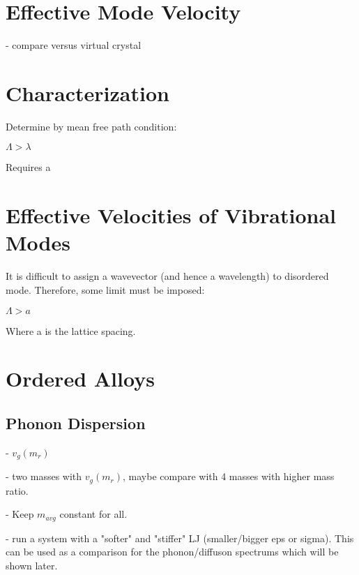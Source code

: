\documentclass[aps,prb,preprint,superscriptaddress,amsmath,amssymb,floatfix]{revtex4}
\begin{document}
\section{\label{S:GroupVeloctiy}Effective Mode Velocity}

- compare versus virtual crystal

\section{\label{S-Motivation}Characterization}

Determine by mean free path condition:

$\Lambda > \lambda$

Requires a 

\section{\label{S-Motivation}Effective Velocities of Vibrational Modes}




It is difficult to assign a wavevector (and hence a wavelength) to 
disordered mode.  Therefore, some limit must be imposed:

$\Lambda > a$

Where a is the lattice spacing.

\section{\label{S-Motivation}Ordered Alloys}

\subsection{\label{S-Introduction-OrderedAlloy-PhonoDispersion}Phonon 
Dispersion}
- $v_g(m_{r})$

- two masses with $v_g(m_{r})$, maybe compare with 4 masses with higher mass 
ratio.  

- Keep  $m_{avg}$ constant for all.

- run a system with a "softer" and "stiffer" LJ (smaller/bigger eps or sigma). 
This can be used as a comparison for the phonon/diffuson spectrums which will be 
shown later.  
\end{document}
